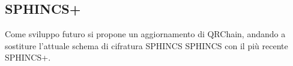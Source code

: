 

\subsection{SPHINCS+}
Come sviluppo futuro si propone un aggiornamento di QRChain, andando a sostiture l'attuale schema di cifratura SPHINCS SPHINCS con il più recente SPHINCS+.

